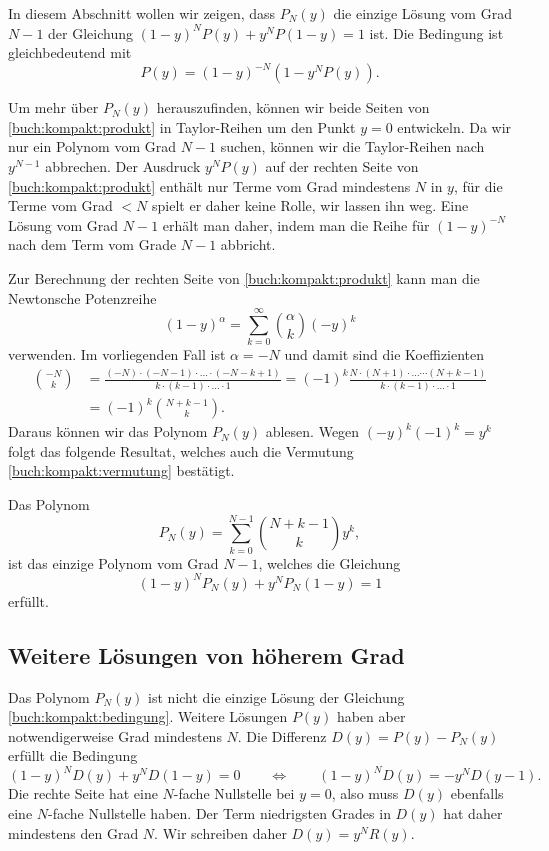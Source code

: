 In diesem Abschnitt wollen wir zeigen, dass $P_N(y)$ die einzige Lösung vom
Grad $N-1$ der Gleichung
$
(1-y)^NP(y)+y^NP(1-y)=1
$
ist.
Die Bedingung ist gleichbedeutend mit
\begin{equation}
P(y) = (1-y)^{-N} (1-y^NP(y)).
\label{buch:kompakt:produkt}
\end{equation}

Um mehr über $P_N(y)$ herauszufinden, können wir beide Seiten von
\eqref{buch:kompakt:produkt} in Taylor-Reihen um den Punkt $y=0$
entwickeln.
Da wir nur ein Polynom vom Grad $N-1$ suchen, können wir die Taylor-Reihen
nach $y^{N-1}$ abbrechen.
Der Ausdruck $y^NP(y)$ auf der rechten Seite von \eqref{buch:kompakt:produkt}
enthält nur Terme vom Grad mindestens $N$ in $y$,
für die Terme vom Grad $<N$ spielt er daher keine Rolle, wir lassen ihn weg.
Eine Lösung vom Grad $N-1$ erhält man daher, indem man die Reihe
für $(1-y)^{-N}$ nach dem Term vom Grade $N-1$ abbricht.

Zur Berechnung der rechten Seite von \eqref{buch:kompakt:produkt}
kann man die Newtonsche Potenzreihe
%
%
\begin{equation*}
(1-y)^{\alpha} = \sum_{k=0}^{\infty} \binom{\alpha}{k} (-y)^k
\end{equation*}
verwenden.
Im vorliegenden Fall ist $\alpha=-N$ und damit sind die Koeffizienten
\begin{align*}
\binom{-N}{k}
&=
\frac{(-N)\cdot(-N-1)\cdot\dots\cdot (-N-k+1)}{k\cdot (k-1)\cdot\dots\cdot 1}
=
(-1)^k \frac{N\cdot(N+1)\cdot\dots\cdots (N+k-1)}{k\cdot(k-1)\cdot\dots\cdot 1}
\\
&=
(-1)^k \binom{N+k-1}{k}.
\end{align*}
Daraus können wir das Polynom $P_N(y)$ ablesen.
Wegen $(-y)^k(-1)^k=y^k$ folgt das folgende Resultat,
welches auch die Vermutung \eqref{buch:kompakt:vermutung} bestätigt.

\begin{konsequenz}
\label{buch:kompakt:lemma-partial}
Das Polynom
\begin{equation}
P_N(y) = \sum_{k=0}^{N-1} \binom{N+k-1}{k}y^k,
\end{equation}
ist das einzige Polynom vom Grad $N-1$, welches die Gleichung
\[
(1-y)^NP_N(y) + y^NP_N(1-y)=1
\]
erfüllt.
\end{konsequenz}

\subsection{Weitere Lösungen von höherem Grad
\label{subsection:weitere loesungen}}
Das Polynom $P_N(y)$ ist nicht die einzige Lösung der Gleichung
\eqref{buch:kompakt:bedingung}.
Weitere Lösungen $P(y)$ haben aber notwendigerweise Grad mindestens $N$.
Die Differenz $D(y) = P(y)-P_N(y)$ erfüllt die Bedingung
\[
(1-y)^N D(y) + y^N D(1-y) = 0
\qquad\Leftrightarrow\qquad
(1-y)^N D(y) = -y^N D(y-1).
\]
Die rechte Seite hat eine $N$-fache Nullstelle bei $y=0$, also muss
$D(y)$ ebenfalls eine $N$-fache Nullstelle haben. 
Der Term niedrigsten Grades in $D(y)$ hat daher mindestens den Grad $N$.
Wir schreiben daher $D(y) = y^NR(y)$.

